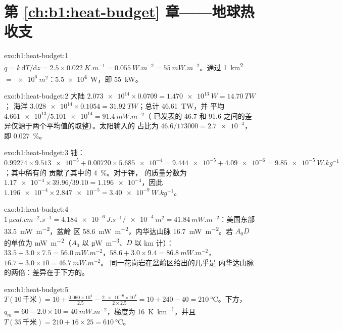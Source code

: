 \section*{第 \ref{ch:b1:heat-budget} 章——地球热收支}

\begin{solution}{exo:b1:heat-budget:1}
$q = k\,\mathrm dT/\mathrm dz = 2.5\times\qty{0.022}{K.m^{-1}} =
\qty{0.055}{W.m^{-2}} = \qty{55}{mW.m^{-2}}$。通过 \qty{1}{km^2} $=
\qty{e6}{m^2}$：\qty{5.5e4}{W}，即 \qty{55}{kW}。
\end{solution}

\begin{solution}{exo:b1:heat-budget:2}
大陆 $\num{2.073e14}\times0.0709 = \qty{1.470e13}{W} = \qty{14.70}{TW}$；
海洋 $\num{3.028e14}\times0.1054 = \qty{31.92}{TW}$；总计 \qty{46.61}{TW}，并
平均 $\num{4.661e13}/\num{5.101e14} = \qty{91.4}{mW.m^{-2}}$（
已发表的 46.7 和 91.6 之间的差异仅源于两个平均值的取整）。太阳输入的
占比为 $46.6/173000 = \num{2.7e-4}$，即
\qty{0.027}{\percent}。
\end{solution}

\begin{solution}{exo:b1:heat-budget:3}
铀：$0.99274\times\num{9.513e-5} + 0.00720\times\num{5.685e-4} =
\num{9.444e-5} + \num{4.09e-6} = \qty{9.85e-5}{W.kg^{-1}}$；其中稀有的
 贡献了其中的 \qty{4}{\percent}。对于钾，
 的质量分数为 $\num{1.17e-4}\times39.96/39.10 = \num{1.196e-4}$，因此
$\num{1.196e-4}\times\num{2.847e-5} = \qty{3.40e-9}{W.kg^{-1}}$。
\end{solution}

\begin{solution}{exo:b1:heat-budget:4}
$\qty{1}{\micro cal.cm^{-2}.s^{-1}} = \num{4.184e-6}\,\unit{J.s^{-1}}/\qty{e-4}{m^2}
= \qty{41.84}{mW.m^{-2}}$：美国东部 \qty{33.5}{mW.m^{-2}}，盆岭
区 \qty{58.6}{mW.m^{-2}}，内华达山脉 \qty{16.7}{mW.m^{-2}}。若 $A_0D$ 的单位为
\unit{mW.m^{-2}}（$A_0$ 以 \unit{\micro W.m^{-3}}、$D$ 以 \unit{km} 计）：
$33.5 + 3.0\times7.5 = \qty{56.0}{mW.m^{-2}}$，$58.6 + 3.0\times9.4 =
\qty{86.8}{mW.m^{-2}}$，$16.7 + 3.0\times10 = \qty{46.7}{mW.m^{-2}}$。
同一花岗岩在盆岭区给出的几乎是
内华达山脉的两倍：差异在于下方的。
\end{solution}

\begin{solution}{exo:b1:heat-budget:5}
$T(10\,\text{千米}) = 10 + \frac{0.060\times10^4}{2.5} - \frac{\num{2e-6}\times10^8}{2\times2.5}
= 10 + 240 - 40 = \qty{210}{\degreeCelsius}$。下方，$q_m = 60 - 2.0\times10 =
\qty{40}{mW.m^{-2}}$，梯度为 \qty{16}{K.km^{-1}}，并且
$T(35\,\text{千米}) = 210 + 16\times25 = \qty{610}{\degreeCelsius}$。
\end{solution}

